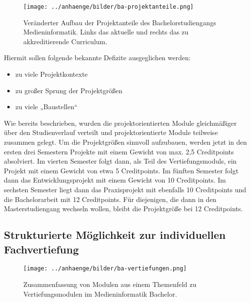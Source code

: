 \begin{figure}[htbp]
\centering
\texttt{[image: ../anhaenge/bilder/ba-projektanteile.png]}
\caption{Veränderter Aufbau der Projektanteile des Bachelorstudiengangs
Medieninformatik. Links das aktuelle und rechts das zu akkreditierende
Curriculum.}
\end{figure}

Hiermit sollen folgende bekannte Defizite ausgeglichen werden:

\begin{itemize}
\tightlist
\item
  zu viele Projektkontexte
\item
  zu großer Sprung der Projektgrößen
\item
  zu viele „Baustellen``
\end{itemize}

Wie bereits beschrieben, wurden die projektorientierten Module
gleichmäßiger über den Studienverlauf verteilt und projektorientierte
Module teilweise zusammen gelegt. Um die Projektgrößen sinnvoll
aufzubauen, werden jetzt in den ersten drei Semestern Projekte mit einem
Gewicht von max. 2,5 Creditpoints absolviert. Im vierten Semester folgt
dann, als Teil des Vertiefungsmoduls, ein Projekt mit einem Gewicht von
etwa 5 Creditpoints. Im fünften Semester folgt dann das
Entwicklungsprojekt mit einem Gewicht von 10 Creditpoints. Im sechsten
Semester liegt dann das Praxisprojekt mit ebenfalls 10 Creditpoints und
die Bachelorarbeit mit 12 Creditpoints. Für diejenigen, die dann in den
Masterstudiengang wechseln wollen, bleibt die Projektgröße bei 12
Creditpoints.

\subsection{Strukturierte Möglichkeit zur individuellen
Fachvertiefung\label{/mi-2017/selbstbericht/0150-soll-zustand-geplante-veraenderungen/0000-geplante-veraenderungen-bachelor}}\label{strukturierte-muxf6glichkeit-zur-individuellen-fachvertiefungpathlabelmi-2017selbstbericht0150-soll-zustand-geplante-veraenderungen0000-geplante-veraenderungen-bachelor}

\begin{figure}[htbp]
\centering
\texttt{[image: ../anhaenge/bilder/ba-vertiefungen.png]}
\caption{Zusammenfassung von Modulen aus einem Themenfeld zu
Vertiefungsmodulen im Medieninformatik Bachelor.}
\end{figure}

